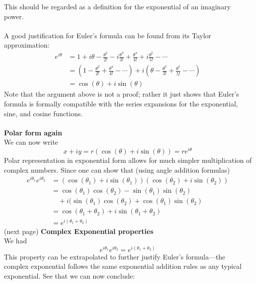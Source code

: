 \documentclass{report}
\begin{document}
This should be regarded as a definition for the exponential of an imaginary power.\\
\vspace{1mm}\\
A good justification for Euler's formula can be found from
its Taylor approximation:
\begin{align*}
e^{i\theta}&=1+i\theta-\frac{\theta^2}{2!}-i\frac{\theta^3}{3!}+\frac{\theta^4}{4!}+i\frac{\theta^5}{5!}-\cdots\\
&=\left(1-\frac{\theta^2}{2!}+\frac{\theta^4}{4!}-\cdots\right)+i\left(\theta-\frac{\theta^3}{3!}
+\frac{\theta^5}{5!}-\cdots\right)\\
&=\cos(\theta)+i\sin(\theta)
\end{align*}
Note that the argument above is not a proof; rather it just shows that Euler's formula is formally compatible with
the series expansions for the exponential, sine, and cosine functions.\\
\vspace{1mm}\\
\textbf{Polar form again}\\
We can now write
\begin{equation*}
x+iy=r(\cos(\theta)+i\sin(\theta))=re^{i\theta}
\end{equation*}
Polar representation in exponential form allows for much simpler multiplication of complex numbers. Since one can
show that (using angle addition formulas)
\begin{align*}
e^{i\theta_1}e^{i\theta_2}&=(\cos(\theta_1)+i\sin(\theta_1))(\cos(\theta_2)+i\sin(\theta_2))\\
&=\cos(\theta_1)\cos(\theta_2)-\sin(\theta_1)\sin(\theta_2)\\&\quad+i(\sin(\theta_1)\cos(\theta_2)+\cos(\theta_1)\sin(\theta_2)\\
&=\cos(\theta_1+\theta_2)+i\sin(\theta_1+\theta_2)\\
&=e^{i(\theta_1+\theta_2)}
\end{align*}
(next page)
\newpage
\noindent\textbf{Complex Exponential properties}\\
We had
\begin{equation*}
e^{i\theta_1}e^{i\theta_2}=e^{i(\theta_1+\theta_2)}
\end{equation*}
This property can be extrapolated to further justify Euler's formula---the complex exponential follows
the same exponential addition rules as any typical exponential. See that we can now conclude:\\
\vspace{1mm}\\
\end{document}

